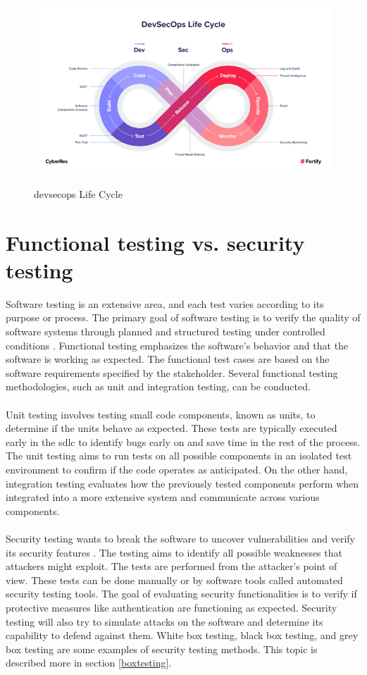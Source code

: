 \begin{figure}[H]
    \centering
    \includegraphics[width=0.8\columnwidth]{Images/devsec.png}
    \caption{\acrshort{devsecops} Life Cycle}
    \label{fig: DevSecOps Life Cycle}\cite{devsecopsbilde}
\end{figure}


\section{Functional testing vs. security testing}
\label{Functional Testing vs Security Testing}
Software testing is an extensive area, and each test varies according to its purpose or process. The primary goal of software testing is to verify the quality of software systems through planned and structured testing under controlled conditions \cite{difftesting}. Functional testing emphasizes the software's behavior and that the software is working as expected. The functional test cases are based on the software requirements specified by the stakeholder. Several functional testing methodologies, such as unit and integration testing, can be conducted. 
\\~\\
Unit testing involves testing small code components, known as units, to determine if the units behave as expected\cite{unitvsintergration}. These tests are typically executed early in the \acrshort{sdlc} to identify bugs early on and save time in the rest of the process. The unit testing aims to run tests on all possible components in an isolated test environment to confirm if the code operates as anticipated. On the other hand, integration testing evaluates how the previously tested components perform when integrated into a more extensive system and communicate across various components.
\\~\\
Security testing wants to break the software to uncover vulnerabilities and verify its security features \cite{whysectest}. The testing aims to identify all possible weaknesses that attackers might exploit. The tests are performed from the attacker's point of view. These tests can be done manually or by software tools called automated security testing tools. The goal of evaluating security functionalities is to verify if protective measures like authentication are functioning as expected. Security testing will also try to simulate attacks on the software and determine its capability to defend against them. White box testing, black box testing, and grey box testing are some examples of security testing methods. This topic is described more in section \ref{boxtesting}. 

